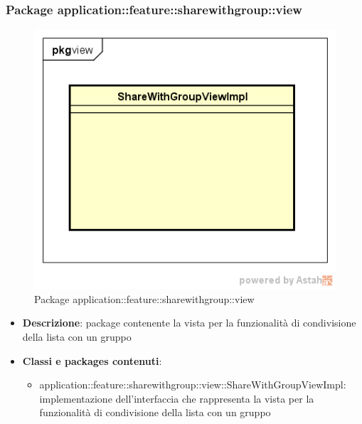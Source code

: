 \subsubsection{Package application::feature::sharewithgroup::view}
\label{Package application::feature::sharewithgroup::view}
\begin{figure}[H]
	\centering
	\includegraphics[scale=0.5]{Sezioni/Packages/Application/share_with_group_view.png}
	\caption{Package application::feature::sharewithgroup::view}
\end{figure}
\begin{itemize}
	\item \textbf{Descrizione}: package contenente la vista per la funzionalità di condivisione della lista con un gruppo
	\item \textbf{Classi e packages contenuti}:
	\begin{itemize}
	\item application::feature::sharewithgroup::view::ShareWithGroupViewImpl: implementazione dell'interfaccia che rappresenta la vista per la funzionalità di condivisione della lista con un gruppo
	\end{itemize}
\end{itemize}

